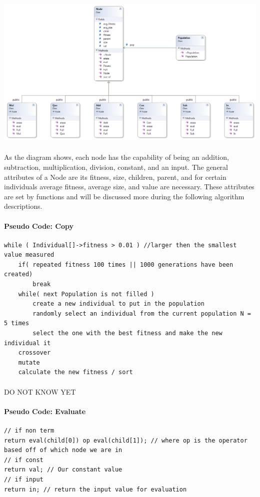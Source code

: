 \documentclass[paper=a4, fontsize=11pt]{scrartcl} %
\numberwithin{equation}{section} %
\numberwithin{figure}{section} %
\numberwithin{table}{section} %
\begin{document}
\includegraphics[scale=.5]{ClassDiagram}

\paragraph{} As the diagram shows, each node has the capability of being an addition, subtraction, multiplication, division, constant, and an input. The general attributes of a Node are its fitness, size, children, parent, and for certain individuals average fitness, average size, and value are necessary. These attributes are set by functions and will be discussed more during the following algorithm descriptions.

\paragraph{Pseudo Code: Copy}
\begin{verbatim}
while ( Individual[]->fitness > 0.01 ) //larger then the smallest value measured
    if( repeated fitness 100 times || 1000 generations have been created)
        break
    while( next Population is not filled )
        create a new individual to put in the population
        randomly select an individual from the current population N = 5 times
        select the one with the best fitness and make the new individual it
    crossover
    mutate
    calculate the new fitness / sort
\end{verbatim}

\paragraph{} DO NOT KNOW YET

\paragraph{Pseudo Code: Evaluate}
\begin{verbatim}
// if non term
return eval(child[0]) op eval(child[1]); // where op is the operator based off of which node we are in
// if const
return val; // Our constant value
// if input
return in; // return the input value for evaluation
\end{verbatim}
\end{document}
